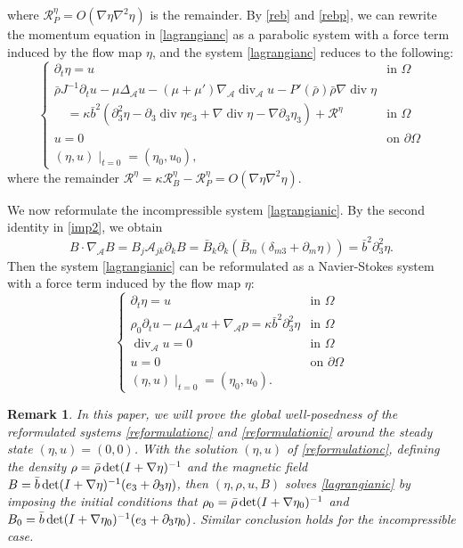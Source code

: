\documentclass[a4paper,reqno,11pt]{amsart}
\numberwithin{equation}{section}
\newtheorem{remark}[lem]{Remark}
\begin{document}
where $\mathcal{R}_P^\eta=O(\nabla\eta\nabla^2\eta)$ is the remainder. By \eqref{reb} and \eqref{rebp}, we can rewrite the momentum equation in  \eqref{lagrangianc} as a parabolic system with a force term induced by the flow map $\eta$, and the system \eqref{lagrangianc} reduces to the following:
\begin{equation}\label{reformulationc}
\begin{cases}
\partial_t\eta=u & \text{in }
\Omega
 \\ \bar \rho J^{-1}\partial_t u -\mu\Delta_{\mathcal{A}}  {u}-(\mu+\mu')\nabla_{\mathcal{A}} \operatorname{div}_{\mathcal{A}} u- P '(\bar{\rho} )\bar\rho \nabla \operatorname{div} \eta
 &\\\quad=\kappa\bar b^2\left( {\partial}_3^2\eta- {\partial}_3\operatorname{div} \eta e_3+\nabla\operatorname{div} \eta- \nabla{\partial}_3\eta_3\right)+ \mathcal{R}^\eta & \text{in }
\Omega \\
u= 0 &\text{on }{\partial}\Omega
\\ (\eta,  u)\mid_{t=0}=( \eta_0, u_0),
\end{cases}
\end{equation}
where the remainder $\mathcal{R}^\eta=\kappa\mathcal{R}_B^\eta-\mathcal{R}_P^\eta=O(\nabla\eta\nabla^2\eta)$.

We now reformulate the incompressible system \eqref{lagrangianic}. By the second identity in \eqref{imp2}, we obtain
\begin{equation}
B\cdot\nabla_{\mathcal{A}} B=B_j{\mathcal{A}}_{jk}\partial_kB=\bar{B}_k\partial_k(\bar{B}_m(\delta_{m3}+\partial_m\eta))
 =\bar b^2{\partial}_{3}^2\eta.
\end{equation}
Then the system \eqref{lagrangianic} can be reformulated as a Navier-Stokes system with a force term induced by the flow map $\eta$:
\begin{equation}\label{reformulationic}
\begin{cases}
\partial_t\eta=u & \text{in }
\Omega
 \\\rho_0\partial_t u - \mu{\Delta_{\mathcal{A}}} u+{{\nabla}_{\mathcal{A}}} p= \kappa\bar b^2{\partial}_{3}^2\eta& \text{in }
\Omega
\\ {\operatorname{div}_{\mathcal{A}}} u=0 & \text{in }
\Omega \\
u= 0 &\text{on }{\partial}\Omega
\\ (\eta,  u)\mid_{t=0}=( \eta_0, u_0).
\end{cases}
\end{equation}
\begin{remark}
In this paper, we will prove the global well-posedness of the reformulated systems \eqref{reformulationc} and \eqref{reformulationic} around the steady state $(\eta,u)=(0,0)$. With the solution $(\eta,u)$ of \eqref{reformulationc}, defining the density $\rho=\bar\rho\, {\rm det} (I+\nabla\eta) ^{-1}$ and the magnetic field $B = \bar b\,{\rm det} (I+\nabla\eta) ^{-1}(e_3+{\partial}_3 \eta)$, then $(\eta,\rho,u,B)$ solves \eqref{lagrangianic} by imposing the initial conditions that $\rho_0=\bar\rho\, {\rm det} (I+\nabla\eta_0) ^{-1}$ and $B_0= \bar b\,{\rm det} (I+\nabla\eta_0) ^{-1}(e_3+{\partial}_3 \eta_0)$. Similar conclusion holds for the incompressible case.
\end{remark}
\end{document}
